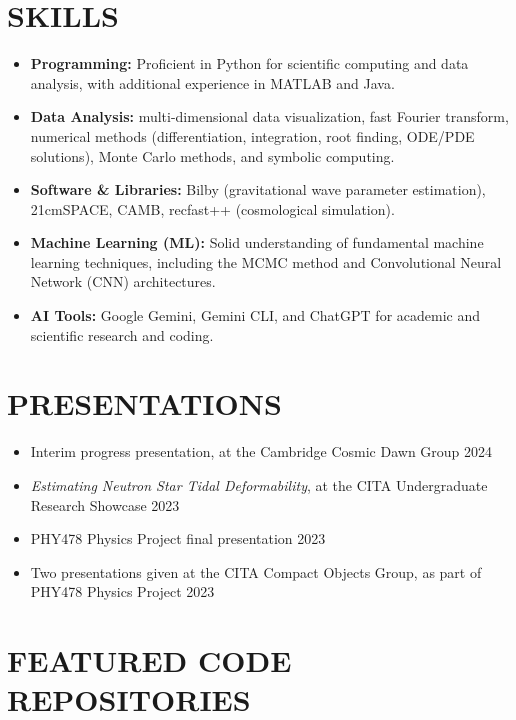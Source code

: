 \documentclass[a4paper,10pt]{extarticle}
\begin{document}
\section*{SKILLS}
\begin{itemize}
    \item \textbf{Programming:} Proficient in Python for scientific computing and data analysis, with additional experience in MATLAB and Java.
    \item \textbf{Data Analysis:} multi-dimensional data visualization, fast Fourier transform, numerical methods (differentiation, integration, root finding, ODE/PDE solutions), Monte Carlo methods, and symbolic computing.
    \item \textbf{Software \& Libraries:} Bilby (gravitational wave parameter estimation), 21cmSPACE, CAMB, recfast++ (cosmological simulation).
    \item \textbf{Machine Learning (ML):} Solid understanding of fundamental machine learning techniques, including the MCMC method and Convolutional Neural Network (CNN) architectures. 
    
    \item \textbf{AI Tools:} Google Gemini, Gemini CLI, and ChatGPT for academic and scientific research and coding.
\end{itemize}

\section*{PRESENTATIONS}
\begin{itemize}
    \item Interim progress presentation, at the Cambridge Cosmic Dawn Group \hfill 2024

    \item \textit{Estimating Neutron Star Tidal Deformability}, at the CITA Undergraduate Research Showcase \hfill 2023

    \item PHY478 Physics Project final presentation \hfill 2023

    \item Two presentations given at the CITA Compact Objects Group, as part of PHY478 Physics Project \hfill 2023
\end{itemize}

\section*{FEATURED CODE REPOSITORIES}
\end{document}
